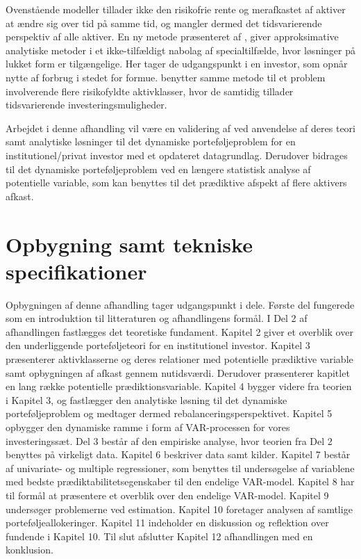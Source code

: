 \documentclass[
  a4paper,
  oneside]{memoir}
\begin{document}
Ovenstående modeller tillader ikke den risikofrie rente og merafkastet af aktiver at ændre sig over tid på samme tid, og mangler dermed det tidsvarierende perspektiv af alle aktiver. En ny metode præsenteret af \citep{CampVic1999, CampVic2001, CampVic2003}, giver approksimative analytiske metoder i et ikke-tilfældigt nabolag af specialtilfælde, hvor løsninger på lukket form er tilgængelige. Her tager de udgangspunkt i en investor, som opnår nytte af forbrug i stedet for formue. \citep{CampVicCha2003} benytter samme metode til et problem involverende flere risikofyldte aktivklasser, hvor de samtidig tillader tidsvarierende investeringsmuligheder.

Arbejdet i denne afhandling vil være en validering af \citep{JurVic2011} ved anvendelse af deres teori samt analytiske løsninger til det dynamiske porteføljeproblem for en institutionel/privat investor med et opdateret datagrundlag. Derudover bidrages til det dynamiske porteføljeproblem ved en længere statistisk analyse af potentielle variable, som kan benyttes til det prædiktive afspekt af flere aktivers afkast.

\hypertarget{opbygning-samt-tekniske-specifikationer}{%
\section{Opbygning samt tekniske specifikationer}\label{opbygning-samt-tekniske-specifikationer}}

Opbygningen af denne afhandling tager udgangspunkt i dele. Første del fungerede som en introduktion til litteraturen og afhandlingens formål. I Del 2 af afhandlingen fastlægges det teoretiske fundament. Kapitel 2 giver et overblik over den underliggende porteføljeteori for en institutionel investor. Kapitel 3 præsenterer aktivklasserne og deres relationer med potentielle prædiktive variable samt opbygningen af afkast gennem nutidsværdi. Derudover præsenterer kapitlet en lang række potentielle prædiktionsvariable. Kapitel 4 bygger videre fra teorien i Kapitel 3, og fastlægger den analytiske løsning til det dynamiske porteføljeproblem og medtager dermed rebalanceringsperspektivet. Kapitel 5 opbygger den dynamiske ramme i form af VAR-processen for vores investeringssæt. Del 3 består af den empiriske analyse, hvor teorien fra Del 2 benyttes på virkeligt data. Kapitel 6 beskriver data samt kilder. Kapitel 7 består af univariate- og multiple regressioner, som benyttes til undersøgelse af variablene med bedste prædiktabilitetsegenskaber til den endelige VAR-model. Kapitel 8 har til formål at præsentere et overblik over den endelige VAR-model. Kapitel 9 undersøger problemerne ved estimation. Kapitel 10 foretager analysen af samtlige porteføljeallokeringer. Kapitel 11 indeholder en diskussion og reflektion over fundende i Kapitel 10. Til slut afslutter Kapitel 12 afhandlingen med en konklusion.
\end{document}
